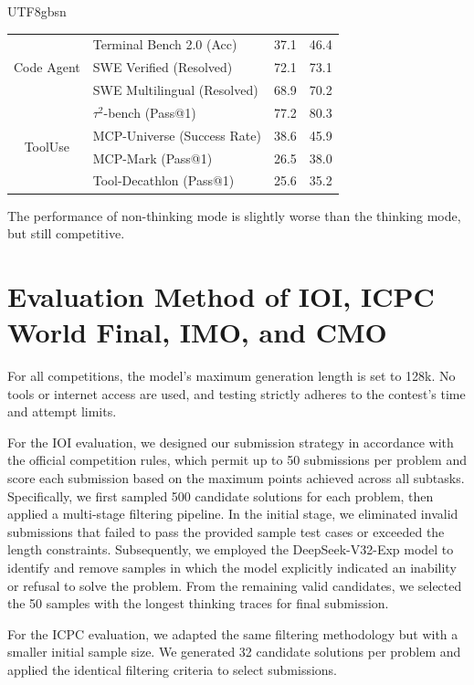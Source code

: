 \documentclass[11pt, a4paper, logo, copyright, nonumbering]{deepseek}
\begin{document}
\begin{CJK*}{UTF8}{gbsn}
\begin{table}[htbp]
\begin{tabular}{@{}c l | c  c  }
     \multirow{3}{*}{Code Agent} & Terminal Bench 2.0 {\tiny (Acc)}  &37.1 & 46.4\\
      & SWE Verified {\tiny (Resolved)}  &72.1& 73.1\\
      & SWE Multilingual {\tiny (Resolved)}  &68.9 & 70.2 \\  \midrule

         \multirow{4}{*}{ToolUse}  &$\tau^2$-bench {\tiny (Pass@1)} & 77.2& 80.3 \\
         & MCP-Universe \tiny{(Success Rate)}  &38.6  & 45.9\\
      &  MCP-Mark {\tiny (Pass@1)} & 26.5 &38.0  \\
      & Tool-Decathlon {\tiny (Pass@1)}  & 25.6 & 35.2   \\  
      
    \bottomrule
    \end{tabular}
    
    \label{tab:nonthink}
\end{table}

The performance of non-thinking mode is slightly worse than the thinking mode, but still competitive. 

\section{Evaluation Method of IOI, ICPC World Final, IMO, and CMO}
\label{appendix:ioi_eval}
For all competitions, the model's maximum generation length is set to 128k. No tools or internet access are used, and testing strictly adheres to the contest's time and attempt limits.

For the IOI evaluation, we designed our submission strategy in accordance with the official competition rules, which permit up to 50 submissions per problem and score each submission based on the maximum points achieved across all subtasks. Specifically, we first sampled 500 candidate solutions for each problem, then applied a multi-stage filtering pipeline. In the initial stage, we eliminated invalid submissions that failed to pass the provided sample test cases or exceeded the length constraints. Subsequently, we employed the DeepSeek-V32-Exp model to identify and remove samples in which the model explicitly indicated an inability or refusal to solve the problem. From the remaining valid candidates, we selected the 50 samples with the longest thinking traces for final submission.

For the ICPC evaluation, we adapted the same filtering methodology but with a smaller initial sample size. We generated 32 candidate solutions per problem and applied the identical filtering criteria to select submissions.


\end{CJK*}
\end{document}
